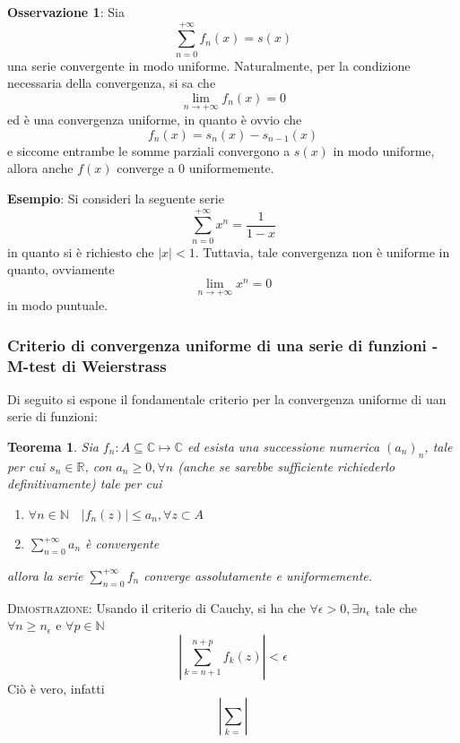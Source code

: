 \documentclass[a4paper]{extarticle}
\newtheorem{theorem}{Teorema}[section]
\begin{document}
\vspace{1em}
\noindent
\textbf{Osservazione 1}: Sia
\[\sum_{n=0}^{+\infty} f_n(x) = s(x)\]
una serie convergente in modo uniforme. Naturalmente, per la condizione necessaria della convergenza, si sa che
\[\lim_{n \to +\infty} f_n(x) = 0\]
ed è una convergenza uniforme, in quanto è ovvio che
\[f_n(x) = s_n(x) - s_{n-1}(x)\]
e siccome entrambe le somme parziali convergono a $s(x)$ in modo uniforme, allora anche $f(x)$ converge a $0$ uniformemente.

\vspace{1em}
\noindent
\textbf{Esempio}: Si consideri la seguente serie
\[\sum_{n=0}^{+\infty} x^n = \frac{1}{1-x}\]
in quanto si è richiesto che $\vert x \vert < 1$. Tuttavia, tale convergenza non è uniforme in quanto, ovviamente
\[\lim_{n \to +\infty} x^n = 0\]
in modo puntuale.

\vspace{1em}
\subsubsection{Criterio di convergenza uniforme di una serie di funzioni - M-test di Weierstrass}
Di seguito si espone il fondamentale criterio per la convergenza uniforme di uan serie di funzioni:

\begin{theorem}
    Sia $f_n : A \subseteq \mathbb{C} \longmapsto \mathbb{C}$ ed esista una successione numerica $(a_n)_n$, tale per cui $s_n \in \mathbb{R}$, con $a_n \geq 0, \forall n$ (anche se sarebbe sufficiente richiederlo definitivamente) tale per cui
    \begin{enumerate}
        \item $\forall n \in \mathbb{N} \hspace{1em} \vert f_n(z) \vert \leq a_n, \forall z \subset A$
        \item $\displaystyle{\sum_{n=0}^{+\infty} a_n}$ è convergente
    \end{enumerate}
    allora la serie $\displaystyle{\sum_{n=0}^{+\infty} f_n}$ converge assolutamente e uniformemente.
\end{theorem}

\vspace{2em}
\noindent
\normalfont \normalsize
\textsc{Dimostrazione}: Usando il criterio di Cauchy, si ha che $\forall \epsilon > 0, \exists n_\epsilon$ tale che $\forall n \geq n_\epsilon$ e $\forall p \in \mathbb{N}$
\[\left \vert \sum_{k=n+1}^{n+p} f_k(z) \right \vert < \epsilon\]
Ciò è vero, infatti
\[\left \vert \sum_{k=}\right \vert\]
\end{document}
